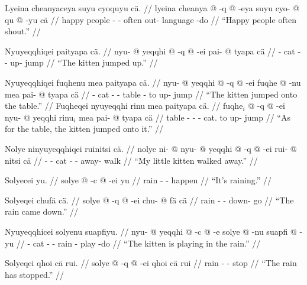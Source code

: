 \documentclass{article}
\begin{document}
\ex[lingstyle=QuCheanya] \begingl
\glpreamble Lyeina cheanyaceya suyu cyoquyu c\"a. //
\gla lyeina cheanya @ -q @ -eya suyu cyo- @ qu @ -yu c\"a //
\glb happy people - - often out- language -do  //
\glft ``Happy people often shout.'' //
\endgl \xe

\ex[lingstyle=QuCheanya] \begingl
\glpreamble Nyuyeqqhiqei paityapa c\"a. //
\gla nyu- @ yeqqhi @ -q @ -ei pai- @ tyapa c\"a //
\glb {}- cat - - up- jump  //
\glft ``The kitten jumped up.'' //
\endgl \xe

\pex[lingstyle=QuCheanya] 
\a \begingl
\glpreamble Nyuyeqqhiqei fuqhenu mea paityapa c\"a. //
\gla nyu- @ yeqqhi @ -q @ -ei fuqhe @ -nu mea pai- @ tyapa c\"a //
\glb {}- cat - - table - to up- jump  //
\glft ``The kitten jumped onto the table.'' //
\endgl
\a \begingl
\glpreamble Fuqheqei nyuyeqqhi rinu mea paityapa c\"a. //
\gla fuqhe$_i$ @ -q @ -ei nyu- @ yeqqhi rinu$_i$ mea pai- @ tyapa c\"a //
\glb table - - - cat.  to up- jump  //
\glft ``As for the table, the kitten jumped onto it.'' //
\endgl \xe

\ex[lingstyle=QuCheanya] \begingl
\glpreamble Nolye ninyuyeqqhiqei ruinitsi c\"a. //
\gla nolye ni- @ nyu- @ yeqqhi @ -q @ -ei rui- @ nitsi c\"a //
\glb {} - - cat - - away- walk  //
\glft ``My little kitten walked away.'' //
\endgl \xe

\ex[lingstyle=QuCheanya] \begingl
\glpreamble Solyecei yu. //
\gla solye @ -c @ -ei yu //
\glb rain - - happen //
\glft ``It's raining.'' //
\endgl \xe

\ex[lingstyle=QuCheanya] \begingl
\glpreamble Solyeqei chuf\"a c\"a. //
\gla solye @ -q @ -ei chu- @ f\"a c\"a //
\glb rain - - down- go  //
\glft ``The rain came down.'' //
\endgl \xe

\ex[lingstyle=QuCheanya] 
\begingl
\glpreamble Nyuyeqqhicei solyenu suapfiyu. //
\gla nyu- @ yeqqhi @ -c @ -e solye @ -nu suapfi @ -yu //
\glb {}- cat - - rain - play -do //
\glft ``The kitten is playing in the rain.'' //
\endgl 
\xe

\ex[lingstyle=QuCheanya] \begingl
\glpreamble Solyeqei qhoi c\"a rui. //
\gla solye @ -q @ -ei qhoi c\"a rui //
\glb rain - - stop   //
\glft ``The rain has stopped.'' //
\endgl \xe
\end{document}
